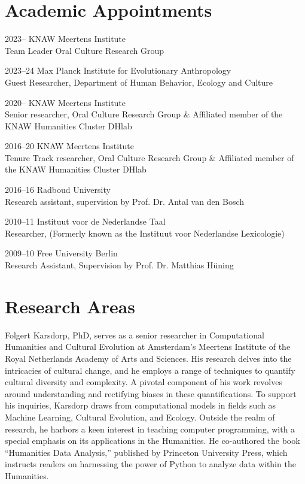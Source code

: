 \documentclass[12pt,letterpaper]{report}
\begin{document}
\section*{Academic Appointments}
\begin{tablist}
\item[2023--]   \tab{}KNAW Meertens Institute \\
  Team Leader Oral Culture Research Group
\item[2023--24]   \tab{}Max Planck Institute for Evolutionary Anthropology \\
  Guest Researcher, Department of Human Behavior, Ecology and Culture
\item[2020--]   \tab{}KNAW Meertens Institute \\
  Senior researcher, Oral Culture Research Group \& Affiliated member of the KNAW Humanities
  Cluster DHlab

\item[2016--20] \tab{}KNAW Meertens Institute \\
  Tenure Track researcher, Oral Culture Research Group \& Affiliated member of the KNAW
  Humanities Cluster DHlab

\item[2016--16] \tab{}Radboud University \\
  Research assistant, supervision by Prof. Dr. Antal van den Bosch

\item[2010--11] \tab{}Instituut voor de Nederlandse Taal \\
  Researcher, (Formerly known as the Instituut voor Nederlandse Lexicologie)

\item[2009--10] \tab{}Free University Berlin \\
  Research Assistant, Supervision by Prof. Dr. Matthias Hüning
\end{tablist}

\section*{Research Areas}

Folgert Karsdorp, PhD, serves as a senior researcher in Computational Humanities
and Cultural Evolution at Amsterdam’s Meertens Institute of the Royal
Netherlands Academy of Arts and Sciences. His research delves into the
intricacies of cultural change, and he employs a range of techniques to quantify
cultural diversity and complexity. A pivotal component of his work revolves
around understanding and rectifying biases in these quantifications. To support
his inquiries, Karsdorp draws from computational models in fields such as
Machine Learning, Cultural Evolution, and Ecology. Outside the realm of
research, he harbors a keen interest in teaching computer programming, with a
special emphasis on its applications in the Humanities. He co-authored the book
“Humanities Data Analysis,” published by Princeton University Press, which
instructs readers on harnessing the power of Python to analyze data within the
Humanities. 
\end{document}
